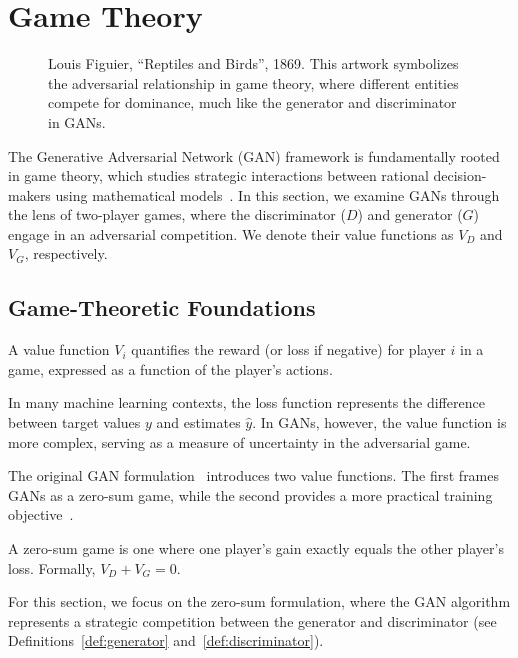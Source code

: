 \section{Game Theory}%
\label{sec:game-theory}
\vspace{0.5cm}
\begin{figure}[h!]%
	\label{fig:paradise-2}
	\centering
	\caption{Louis Figuier, ``Reptiles and Birds'', 1869. This artwork symbolizes the adversarial relationship in game theory, where different entities compete for dominance, much like the generator and discriminator in GANs.}
\end{figure}
\vspace{0.5cm}
The Generative Adversarial Network (GAN) framework is fundamentally rooted in game theory, which studies strategic interactions between rational decision-makers using mathematical models~\cite{ref:myerson}. In this section, we examine GANs through the lens of two-player games, where the discriminator ($D$) and generator ($G$) engage in an adversarial competition. We denote their value functions as $V_D$ and $V_G$, respectively.
\subsection{Game-Theoretic Foundations}
\begin{definition}%
	\label{def:value-function}
	A \textnormal{\sffamily value function} $V_i$ quantifies the reward (or loss if negative) for player $i$ in a game, expressed as a function of the player's actions.
\end{definition}
\begin{remark}
	In many machine learning contexts, the loss function represents the difference between target values $y$ and estimates $\hat{y}$. In GANs, however, the value function is more complex, serving as a measure of uncertainty in the adversarial game.
\end{remark}
The original GAN formulation~\cite{ref:goodfellow-original} introduces two value functions. The first frames GANs as a zero-sum game, while the second provides a more practical training objective~\cite{ref:gidel-variational-2018}.
\begin{definition}%
	\label{def:zero-sum-game}
	A \textnormal{\sffamily zero-sum game} is one where one player's gain exactly equals the other player's loss. Formally, $V_D + V_G = 0$.
\end{definition}
\begin{remark}
	For this section, we focus on the zero-sum formulation, where the GAN algorithm represents a strategic competition between the generator and discriminator (see Definitions~\ref{def:generator} and~\ref{def:discriminator}).
\end{remark}
